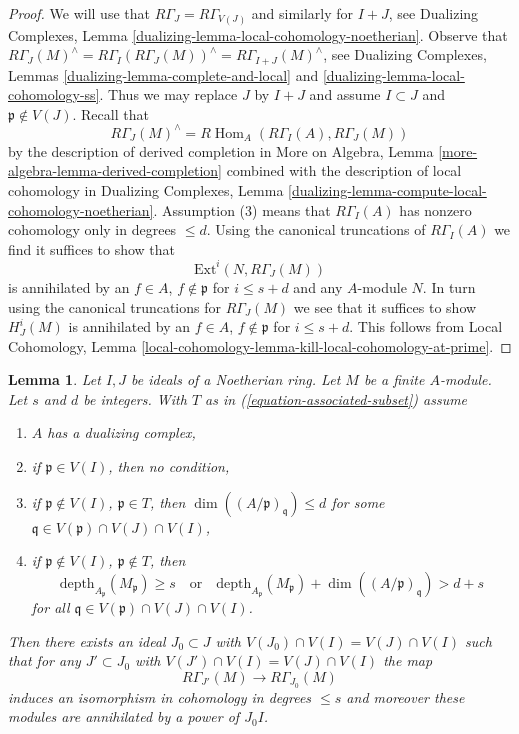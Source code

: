 \documentclass{stacks-project}
\theoremstyle{plain}
\newtheorem{lemma}[subsection]{Lemma}
\theoremstyle{definition}
\theoremstyle{remark}
\numberwithin{equation}{subsection}
\def\Hom{\mathop{\mathrm{Hom}}\nolimits}
\begin{document}
\begin{proof}
We will use that $R\Gamma_J = R\Gamma_{V(J)}$ and similarly for
$I + J$, see
Dualizing Complexes, Lemma \ref{dualizing-lemma-local-cohomology-noetherian}.
Observe that
$R\Gamma_J(M)^\wedge = R\Gamma_I(R\Gamma_J(M))^\wedge =
R\Gamma_{I + J}(M)^\wedge$, see
Dualizing Complexes, Lemmas
\ref{dualizing-lemma-complete-and-local} and
\ref{dualizing-lemma-local-cohomology-ss}.
Thus we may replace $J$ by $I + J$ and assume $I \subset J$
and $\mathfrak p \not \in V(J)$.
Recall that
$$
R\Gamma_J(M)^\wedge = R\Hom_A(R\Gamma_I(A), R\Gamma_J(M))
$$
by the description of derived completion in
More on Algebra, Lemma \ref{more-algebra-lemma-derived-completion}
combined with the description of local cohomology in
Dualizing Complexes, Lemma
\ref{dualizing-lemma-compute-local-cohomology-noetherian}.
Assumption (3) means that $R\Gamma_I(A)$ has nonzero cohomology
only in degrees $\leq d$. Using the canonical truncations of
$R\Gamma_I(A)$ we find it suffices to show that
$$
\text{Ext}^i(N, R\Gamma_J(M))
$$
is annihilated by an $f \in A$, $f \not \in \mathfrak p$ for
$i \leq s + d$ and any $A$-module $N$.
In turn using the canonical truncations for $R\Gamma_J(M)$
we see that it suffices to show
$H^i_J(M)$ is annihilated by an $f \in A$, $f \not \in \mathfrak p$
for $i \leq s + d$.
This follows from Local Cohomology, Lemma
\ref{local-cohomology-lemma-kill-local-cohomology-at-prime}.
\end{proof}

\begin{lemma}
\label{lemma-kill-colimit-weak-general}
Let $I, J$ be ideals of a Noetherian ring. Let $M$ be a finite $A$-module.
Let $s$ and $d$ be integers. With $T$ as in
(\ref{equation-associated-subset}) assume
\begin{enumerate}
\item $A$ has a dualizing complex,
\item if $\mathfrak p \in V(I)$, then no condition,
\item if $\mathfrak p \not \in V(I)$, $\mathfrak p \in T$, then
$\dim((A/\mathfrak p)_\mathfrak q) \leq d$ for some
$\mathfrak q \in V(\mathfrak p) \cap V(J) \cap V(I)$,
\item if $\mathfrak p \not \in V(I)$, $\mathfrak p \not \in T$, then
$$
\text{depth}_{A_\mathfrak p}(M_\mathfrak p) \geq s
\quad\text{or}\quad
\text{depth}_{A_\mathfrak p}(M_\mathfrak p) +
\dim((A/\mathfrak p)_\mathfrak q) > d + s
$$
for all $\mathfrak q \in V(\mathfrak p) \cap V(J) \cap V(I)$.
\end{enumerate}
Then there exists an ideal $J_0 \subset J$ with
$V(J_0) \cap V(I) = V(J) \cap V(I)$ such that for any $J' \subset J_0$ with
$V(J') \cap V(I) = V(J) \cap V(I)$ the map
$$
R\Gamma_{J'}(M) \longrightarrow R\Gamma_{J_0}(M)
$$
induces an isomorphism in cohomology in degrees $\leq s$
and moreover these modules are annihilated by a power of $J_0I$.
\end{lemma}
\end{document}
